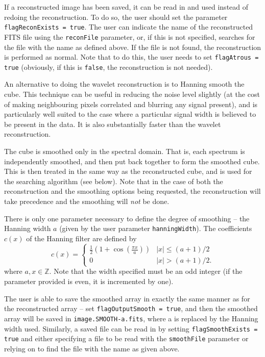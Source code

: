 If a reconstructed image has been saved, it can be read in and used
instead of redoing the reconstruction. To do so, the user should set
the parameter \texttt{flagReconExists = true}. The user can indicate
the name of the reconstructed FITS file using the \texttt{reconFile}
parameter, or, if this is not specified, \duchamp searches for the
file with the name as defined above. If the file is not found, the
reconstruction is performed as normal. Note that to do this, the user
needs to set
\texttt{flagAtrous = true} (obviously, if this is \texttt{false}, the
reconstruction is not needed).

\label{sec-smoothing}

An alternative to doing the wavelet reconstruction is to Hanning
smooth the cube. This technique can be useful in reducing the noise
level slightly (at the cost of making neighbouring pixels correlated
and blurring any signal present), and is particularly well suited to
the case where a particular signal width is believed to be present in
the data. It is also substantially faster than the wavelet
reconstruction.

The cube is smoothed only in the spectral domain. That is, each
spectrum is independently smoothed, and then put back together to form
the smoothed cube. This is then treated in the same way as the
reconstructed cube, and is used for the searching algorithm (see
below). Note that in the case of both the reconstruction and the
smoothing options being requested, the reconstruction will take
precedence and the smoothing will \emph{not} be done.

There is only one parameter necessary to define the degree of
smoothing -- the Hanning width $a$ (given by the user parameter
\texttt{hanningWidth}). The coefficients $c(x)$ of the Hanning filter
are defined by
\[
c(x) = 
  \begin{cases}
   \frac{1}{2}\left(1+\cos(\frac{\pi x}{a})\right) &|x| \leq (a+1)/2\\
   0                                               &|x| > (a+1)/2.
  \end{cases}
\]
where $a,x \in \mathbb{Z}$. Note that the width specified must be an
odd integer (if the parameter provided is even, it is incremented by
one).

The user is able to save the smoothed array in exactly the same manner
as for the reconstructed array -- set \texttt{flagOutputSmooth =
true}, and then the smoothed array will be saved in
\texttt{image.SMOOTH-a.fits}, where a is replaced by the Hanning width
used. Similarly, a saved file can be read in by setting
\texttt{flagSmoothExists = true} and either specifying a file to be
read with the \texttt{smoothFile} parameter or relying on \duchamp to
find the file with the name as given above. 

